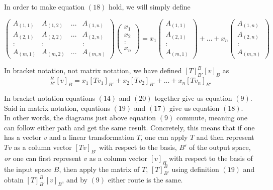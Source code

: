 \documentclass{article}
\theoremstyle{problemstyle}
\begin{document}
In order to make equation $(18)$ hold, we will simply define 

\begin{equation}
\begin{pmatrix} A_{(1,1)} & A_{(1,2)}&  ... & A_{(1,n)} \\
A_{(2,1)} & A_{(2,2)} & ... & A_{(2,n)} \\: & : &   & : \\ A_{(m,1)}& A_{(m,2)} &... & A_{(m,n)} \end{pmatrix} \begin{pmatrix} x_1 \\ x_2 \\ : \\ x_n \end{pmatrix} = 
x_1\begin{pmatrix} A_{(1,1)} \\A_{(2,1)} \\ : \\ A_{(m,1)} \end{pmatrix}  + ... +
x_n\begin{pmatrix} A_{(1,n)} \\A_{(2,n)} \\ : \\ A_{(m,n)} \end{pmatrix}
\end{equation}

In bracket notation, not matrix notation, we have defined $[T]^B_{B'} [v]_B$ as \begin{equation}[T]^B_{B'} [v]_B = x_1[Tv_1]_{B'}+x_2[Tv_2]_{B'}+...+x_n[Tv_n]_{B'}\end{equation} 

In bracket notation equations $(14)$ and $(20)$ together give us equation $(9)$. Said in matrix notation, equations $(19)$ and $(17)$ give us equation $(18)$.\\ 

In other words, the diagrams just above equation $(9)$ commute, meaning one can follow either path and get the same result. Concretely, this means that if one has a vector $v$ and a linear transformation $T$, one can apply $T$ and then represent $Tv$ as a column vector $[Tv]_{B'}$ with respect to the basis, $B'$ of the output space, \textit{or} one can first represent $v$ as a column vector $[v]_B$ with respect to the basis of the input space $B$, then apply the matrix of $T$, $[T]^B_{B'}$ using definition $(19)$ and obtain  $[T]^B_{B'}[v]_B$, and by $(9)$ either route is the same. 
\end{document}
